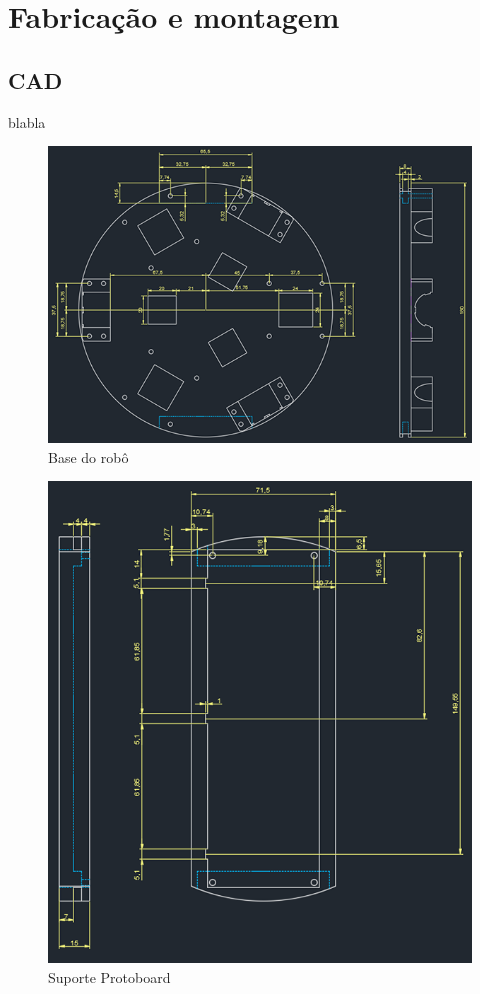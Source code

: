 \chapter{Fabricação e montagem}

\section{CAD}

blabla

\begin{figure}[h]
	\centering
	\includegraphics{figures/cad1}
	\caption{Base do robô}
	\label{fig:base_robo}
\end{figure}

\begin{figure}[h]
	\centering
	\includegraphics{figures/cad2}
	\caption{Suporte Protoboard}
	\label{fig:suport_protoboard}
\end{figure}

